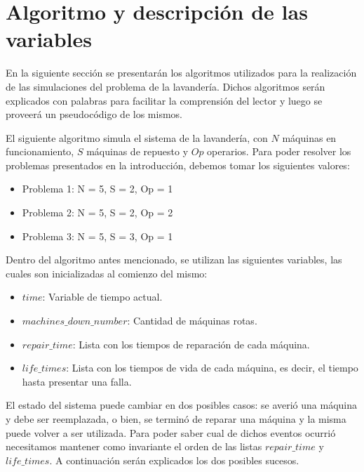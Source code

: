 \section{Algoritmo y descripción de las variables}

  \par En la siguiente sección se presentarán los algoritmos utilizados para la realización de las simulaciones del
  problema de la lavandería. Dichos algoritmos serán explicados con palabras para facilitar la comprensión del lector
  y luego se proveerá un pseudocódigo de los mismos.

  \vspace{5mm}
  \par El siguiente algoritmo simula el sistema de la lavandería, con $N$ máquinas en funcionamiento, $S$ máquinas de
  repuesto y $Op$ operarios. Para poder resolver los problemas presentados en la introducción, debemos tomar los
  siguientes valores:

  \begin{itemize}
    \item Problema 1: N = 5, S = 2, Op = 1
    \item Problema 2: N = 5, S = 2, Op = 2
    \item Problema 3: N = 5, S = 3, Op = 1
  \end{itemize}

  \par Dentro del algoritmo antes mencionado, se utilizan las siguientes variables, las cuales son inicializadas al
  comienzo del mismo:
  \begin{itemize}
    \item $time$: Variable de tiempo actual.
    \item $machines\_down\_number$: Cantidad de máquinas rotas.
    \item $repair\_time$: Lista con los tiempos de reparación de cada máquina.
    \item $life\_times$: Lista con los tiempos de vida de cada máquina, es decir, el tiempo hasta presentar una falla.
  \end{itemize}

  \par El estado del sistema puede cambiar en dos posibles casos: se averió una máquina y debe ser reemplazada, o bien,
  se terminó de reparar una máquina y la misma puede volver a ser utilizada. Para poder saber cual de dichos eventos
  ocurrió necesitamos mantener como invariante el orden de las listas $repair\_time$ y $life\_times$. A continuación
  serán explicados los dos posibles sucesos.

